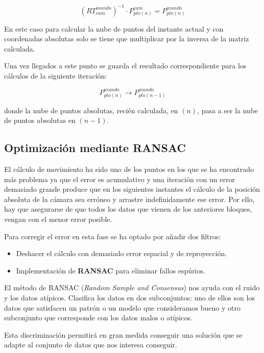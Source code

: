 \begin{equation}
\left(RT_{cam}^{mundo}\right)^{-1}\cdot P_{pto(n)}^{cam}=P_{pto(n)}^{mundo}
\end{equation}

En este caso para calcular la nube de puntos del instante actual y con coordenadas absolutas solo se tiene que multiplicar por la inversa de la matriz calculada.

Una vez llegados a este punto se guarda el resultado correspondiente para los cálculos de la siguiente iteración:

\begin{equation}
P_{pto(n)}^{mundo}\longrightarrow P_{pto(n-1)}^{mundo}
\end{equation}

donde la nube de puntos absolutas, recién calculada, en $(n)$, pasa a ser la nube de puntos absolutas en $(n-1)$.
\subsection{Optimización mediante RANSAC}

El cálculo de movimiento ha sido uno de los puntos en los que se ha encontrado más problema ya que el error es acumulativo y una iteración con un error demasiado grande produce que en los siguientes instantes el cálculo de la posición absoluta de la cámara sea erróneo y arrastre indefinidamente ese error. Por ello, hay que asegurarse de que todos los datos que vienen de los anteriores bloques, vengan con el menor error posible.

Para corregir el error en esta fase se ha optado por añadir dos filtros:

\begin{itemize}
\item Deshacer el cálculo con demasiado error espacial y de reproyección.
\item Implementación de \textbf{RANSAC} para eliminar fallos espúrios.
\end{itemize}

El método de RANSAC (\textit{Random Sample and Consensus}) nos ayuda con el ruido y los datos atípicos. Clasifica los datos en dos subconjuntos: uno de ellos son los datos que satisfacen un patrón o un modelo que consideramos bueno y otro subconjunto que corresponde con los datos malos o atípicos.

Esta discriminación permitirá en gran medida conseguir una solución que se adapte al conjunto de datos que nos interesa conseguir.

